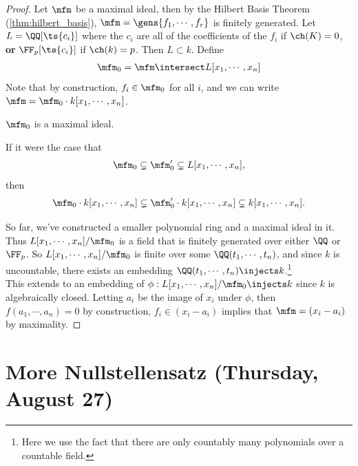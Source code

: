 \begin{proof}

Let \(\mfm\) be a maximal ideal, then by the Hilbert Basis Theorem
(\cref{thm:hilbert_basis}), \(\mfm = \gens{f_1, \cdots, f_r}\) is
finitely generated. Let \(L = \QQ[\ts {c_i}]\) where the \(c_i\) are all
of the coefficients of the \(f_i\) if \(\ch(K) = 0\), \textbf{or}
\(\FF_p[\ts {c_i}]\) if \(\ch(k) = p\). Then \(L\subset k\). Define
\begin{align*}
\mfm_0 = \mfm\intersect L[x_1, \cdots, x_n]
\end{align*} Note that by construction, \(f_i \in \mfm_0\) for all
\(i\), and we can write \(\mfm = \mfm_0 \cdot k[x_1, \cdots, x_n]\).

\begin{claim}

\(\mfm_0\) is a maximal ideal.

\end{claim}

If it were the case that
\begin{align*}  
\mfm_0 \subsetneq \mfm_0' \subsetneq L[x_1, \cdots, x_n]
,\end{align*} then
\begin{align*}  
\mfm_0\cdot k[x_1, \cdots, x_n] \subsetneq \mfm_0'\cdot k[x_1, \cdots, x_n]  \subsetneq k[x_1, \cdots, x_n]
.\end{align*}

So far, we've constructed a smaller polynomial ring and a maximal ideal
in it. Thus \(L[x_1, \cdots, x_n]/\mfm_0\) is a field that is finitely
generated over either \(\QQ\) or \(\FF_p\). So
\(L[x_1, \cdots, x_n]/\mfm_0\) is finite over some
\(\QQ(t_1, \cdots, t_n)\), and since \(k\) is uncountable, there exists
an embedding \(\QQ(t_1, \cdots, t_n) \injects k\).\footnote{Here we use
  the fact that there are only countably many polynomials over a
  countable field.}\\

This extends to an embedding of
\(\phi: L[x_1, \cdots, x_n]/\mfm_0 \injects k\) since \(k\) is
algebraically closed. Letting \(a_i\) be the image of \(x_i\) under
\(\phi\), then \(f(a_1, \cdots, a_n) = 0\) by construction,
\(f_i \in (x_i - a_i)\) implies that \(\mfm = (x_i - a_i)\) by
maximality.

\end{proof}

\hypertarget{more-nullstellensatz-thursday-august-27}{%
\section{More Nullstellensatz (Thursday, August
27)}\label{more-nullstellensatz-thursday-august-27}}

